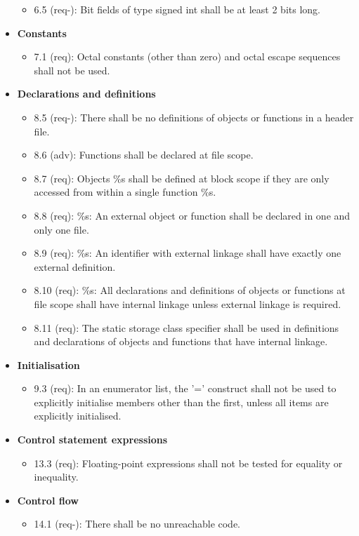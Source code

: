 \begin{itemize}
\begin{itemize}
\item 6.5 (req-): Bit fields of type signed int shall be at least 2 bits long.
\end{itemize}
\item \textbf{Constants}
\begin{itemize}
\item 7.1 (req): Octal constants (other than zero) and octal escape sequences shall not be used.
\end{itemize}
\item \textbf{Declarations and definitions}
\begin{itemize}
\item 8.5 (req-): There shall be no definitions of objects or functions in a header file.
\item 8.6 (adv): Functions shall be declared at file scope.
\item 8.7 (req): Objects \%s shall be defined at block scope if they are only accessed from within a single function \%s.
\item 8.8 (req): \%s: An external object or function shall be declared in one and only one file.
\item 8.9 (req): \%s: An identifier with external linkage shall have exactly one external definition.
\item 8.10 (req): \%s: All declarations and definitions of objects or functions at file scope shall have internal linkage unless external linkage is required.
\item 8.11 (req): The static storage class specifier shall be used in definitions and declarations of objects and functions that have internal linkage.
\end{itemize}
\item \textbf{Initialisation}
\begin{itemize}
\item 9.3 (req): In an enumerator list, the '=' construct shall not be used to explicitly initialise members other than the first, unless all items are explicitly initialised.
\end{itemize}
\item \textbf{Control statement expressions}
\begin{itemize}
\item 13.3 (req): Floating-point expressions shall not be tested for equality or inequality.
\end{itemize}
\item \textbf{Control flow}
\begin{itemize}
\item 14.1 (req-): There shall be no unreachable code.

\end{itemize}
\end{itemize}
